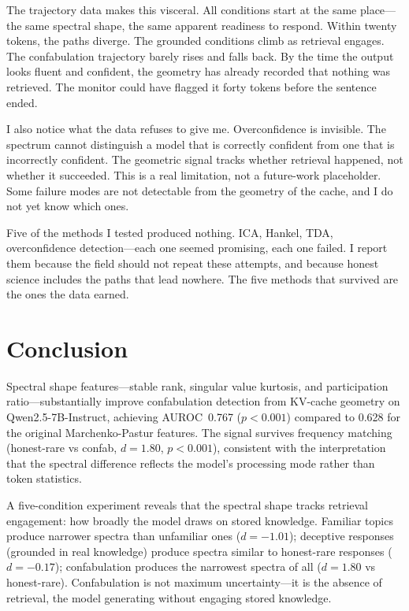 \documentclass[11pt,a4paper]{article}
\begin{document}
The trajectory data makes this visceral. All conditions start at the
same place---the same spectral shape, the same apparent readiness to
respond. Within twenty tokens, the paths diverge. The grounded
conditions climb as retrieval engages. The confabulation trajectory
barely rises and falls back. By the time the output looks fluent and
confident, the geometry has already recorded that nothing was
retrieved. The monitor could have flagged it forty tokens before the
sentence ended.

I also notice what the data refuses to give me. Overconfidence is
invisible. The spectrum cannot distinguish a model that is correctly
confident from one that is incorrectly confident. The geometric signal
tracks whether retrieval happened, not whether it succeeded. This is a
real limitation, not a future-work placeholder. Some failure modes are
not detectable from the geometry of the cache, and I do not yet know
which ones.

Five of the methods I tested produced nothing. ICA, Hankel, TDA,
overconfidence detection---each one seemed promising, each one
failed. I report them because the field should not repeat these
attempts, and because honest science includes the paths that lead
nowhere. The five methods that survived are the ones the data earned.

\section{Conclusion}
\label{sec:conclusion}

Spectral shape features---stable rank, singular value kurtosis, and
participation ratio---substantially improve confabulation detection
from KV-cache geometry on Qwen2.5-7B-Instruct, achieving AUROC~0.767
($p < 0.001$) compared to 0.628 for the original Marchenko-Pastur
features. The signal survives frequency matching (honest-rare vs
confab, $d = 1.80$, $p < 0.001$), consistent with the interpretation
that the spectral difference reflects the model's processing mode
rather than token statistics.

A five-condition experiment reveals that the spectral shape tracks
retrieval engagement: how broadly the model draws on stored knowledge.
Familiar topics produce narrower spectra than unfamiliar ones
($d = -1.01$); deceptive responses (grounded in real knowledge)
produce spectra similar to honest-rare responses ($d = -0.17$);
confabulation produces the narrowest spectra of all ($d = 1.80$ vs
honest-rare). Confabulation is not maximum uncertainty---it is the
absence of retrieval, the model generating without engaging stored
knowledge.
\end{document}
